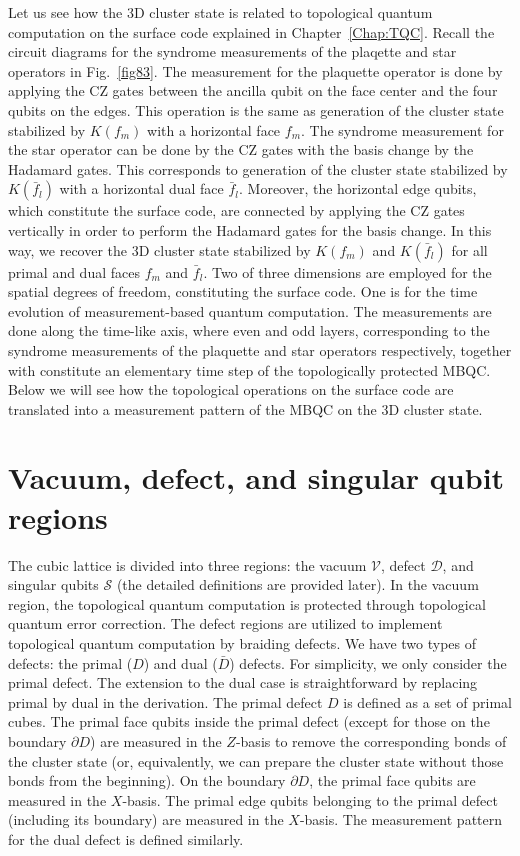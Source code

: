 Let us see how the 3D cluster state is related to 
topological quantum computation on the surface code 
explained in Chapter~\ref{Chap:TQC}.
Recall the circuit diagrams for the 
syndrome measurements of the plaqette and star operators
in Fig.~\ref{fig83}.
The measurement for the plaquette operator is done by 
applying the CZ gates between 
the ancilla qubit on the face center and the four qubits on the edges.
This operation is the same as generation of the cluster state
stabilized by $K(f_m)$ with a horizontal face $f_m$.
The syndrome measurement for the star operator 
can be done by the CZ gates with the basis change by 
the Hadamard gates.
This corresponds to generation of the cluster state
stabilized by $K(\bar f_l)$ with a horizontal dual face $\bar f_l$.
Moreover, the horizontal edge qubits,
which constitute the surface code, are connected 
by applying the CZ gates vertically
in order to perform the Hadamard gates for the basis change.
In this way, we recover the 3D cluster state
stabilized by $K(f_m)$ and $K(\bar f_l)$
for all primal and dual faces $f_m$ and $\bar f_l$.
Two of three dimensions are employed for the 
spatial degrees of freedom, constituting the surface code.
One is for the time evolution of measurement-based quantum computation.
The measurements are done along the time-like axis,
where even and odd layers,
corresponding to the syndrome measurements 
of the plaquette and star operators respectively, 
together with constitute an elementary time step of the topologically 
protected MBQC.
Below we will see how the topological operations on 
the surface code are translated into a measurement pattern 
of the MBQC on the 3D cluster state.

\section{Vacuum, defect, and singular qubit regions}
The cubic lattice is divided into three regions: the vacuum $\mathcal{V}$, defect $\mathcal{D}$, and singular qubits $\mathcal{S}$ (the detailed definitions are provided later).
In the vacuum region, the topological quantum computation is protected
through topological quantum error correction.
The defect regions are utilized to implement topological quantum computation by braiding defects. 
We have two types of defects: the primal ($D$) and dual ($\bar D$) defects.
For simplicity, we only consider the primal defect.
The extension to the dual case is straightforward by replacing primal by dual in the derivation.
The primal defect $D$ is defined as a set of primal cubes.
The primal face qubits inside the primal defect (except for those on the boundary $\partial D$) are measured in the $Z$-basis to remove the corresponding bonds of the cluster state (or, equivalently, we can prepare the cluster state without those bonds from the beginning).
On the boundary $\partial D$, the primal face qubits are measured in the $X$-basis.
The primal edge qubits belonging to the primal defect (including its boundary) are measured in the $X$-basis.
The measurement pattern for the dual defect is defined similarly.

